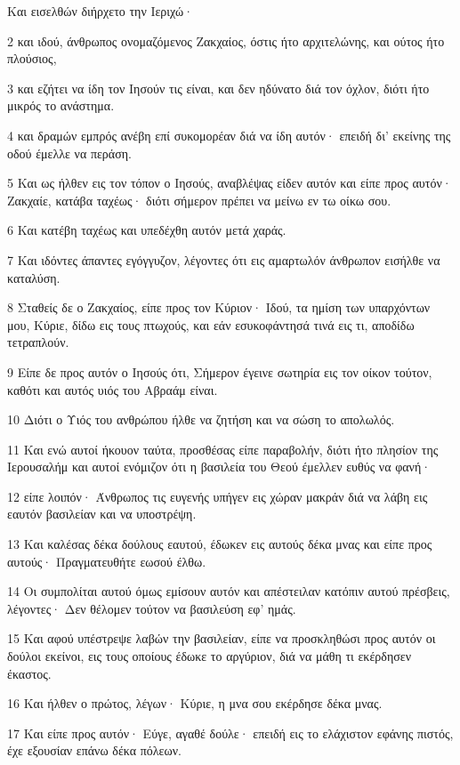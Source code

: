 \par Και εισελθών διήρχετο την Ιεριχώ·
\par 2 και ιδού, άνθρωπος ονομαζόμενος Ζακχαίος, όστις ήτο αρχιτελώνης, και ούτος ήτο πλούσιος,
\par 3 και εζήτει να ίδη τον Ιησούν τις είναι, και δεν ηδύνατο διά τον όχλον, διότι ήτο μικρός το ανάστημα.
\par 4 και δραμών εμπρός ανέβη επί συκομορέαν διά να ίδη αυτόν· επειδή δι' εκείνης της οδού έμελλε να περάση.
\par 5 Και ως ήλθεν εις τον τόπον ο Ιησούς, αναβλέψας είδεν αυτόν και είπε προς αυτόν· Ζακχαίε, κατάβα ταχέως· διότι σήμερον πρέπει να μείνω εν τω οίκω σου.
\par 6 Και κατέβη ταχέως και υπεδέχθη αυτόν μετά χαράς.
\par 7 Και ιδόντες άπαντες εγόγγυζον, λέγοντες ότι εις αμαρτωλόν άνθρωπον εισήλθε να καταλύση.
\par 8 Σταθείς δε ο Ζακχαίος, είπε προς τον Κύριον· Ιδού, τα ημίση των υπαρχόντων μου, Κύριε, δίδω εις τους πτωχούς, και εάν εσυκοφάντησά τινά εις τι, αποδίδω τετραπλούν.
\par 9 Είπε δε προς αυτόν ο Ιησούς ότι, Σήμερον έγεινε σωτηρία εις τον οίκον τούτον, καθότι και αυτός υιός του Αβραάμ είναι.
\par 10 Διότι ο Υιός του ανθρώπου ήλθε να ζητήση και να σώση το απολωλός.
\par 11 Και ενώ αυτοί ήκουον ταύτα, προσθέσας είπε παραβολήν, διότι ήτο πλησίον της Ιερουσαλήμ και αυτοί ενόμιζον ότι η βασιλεία του Θεού έμελλεν ευθύς να φανή·
\par 12 είπε λοιπόν· Άνθρωπος τις ευγενής υπήγεν εις χώραν μακράν διά να λάβη εις εαυτόν βασιλείαν και να υποστρέψη.
\par 13 Και καλέσας δέκα δούλους εαυτού, έδωκεν εις αυτούς δέκα μνας και είπε προς αυτούς· Πραγματευθήτε εωσού έλθω.
\par 14 Οι συμπολίται αυτού όμως εμίσουν αυτόν και απέστειλαν κατόπιν αυτού πρέσβεις, λέγοντες· Δεν θέλομεν τούτον να βασιλεύση εφ' ημάς.
\par 15 Και αφού υπέστρεψε λαβών την βασιλείαν, είπε να προσκληθώσι προς αυτόν οι δούλοι εκείνοι, εις τους οποίους έδωκε το αργύριον, διά να μάθη τι εκέρδησεν έκαστος.
\par 16 Και ήλθεν ο πρώτος, λέγων· Κύριε, η μνα σου εκέρδησε δέκα μνας.
\par 17 Και είπε προς αυτόν· Εύγε, αγαθέ δούλε· επειδή εις το ελάχιστον εφάνης πιστός, έχε εξουσίαν επάνω δέκα πόλεων.
